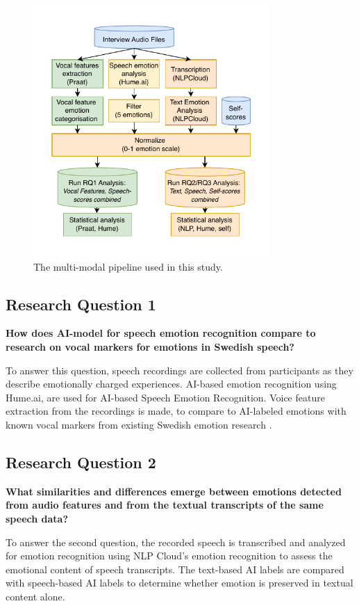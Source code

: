 \begin{figure}[H]
    \centering
    \includegraphics[width=0.8\textwidth]{png/method/flowchart-thesis.pdf}
    \caption{The multi-modal pipeline used in this study.}
    \label{fig:pipeline}
\end{figure}


\subsection{Research Question 1}
\textbf{How does AI-model for speech emotion recognition compare to research on vocal markers for emotions in Swedish speech?}

To answer this question, speech recordings are collected from participants as they describe emotionally charged experiences. AI-based emotion recognition using Hume.ai, are used for AI-based Speech Emotion Recognition. Voice feature extraction from the recordings is made, to compare to AI-labeled emotions with known vocal markers from existing Swedish emotion research \autocite{Ekberg2023}. 

\subsection{Research Question 2}
\textbf{What similarities and differences emerge between emotions detected from audio features and from the textual transcripts of the same speech data?}

To answer the second question, the recorded speech is transcribed and analyzed for emotion recognition using NLP Cloud’s emotion recognition to assess the emotional content of speech transcripts. The text-based AI labels are compared with speech-based AI labels to determine whether emotion is preserved in textual content alone. 

